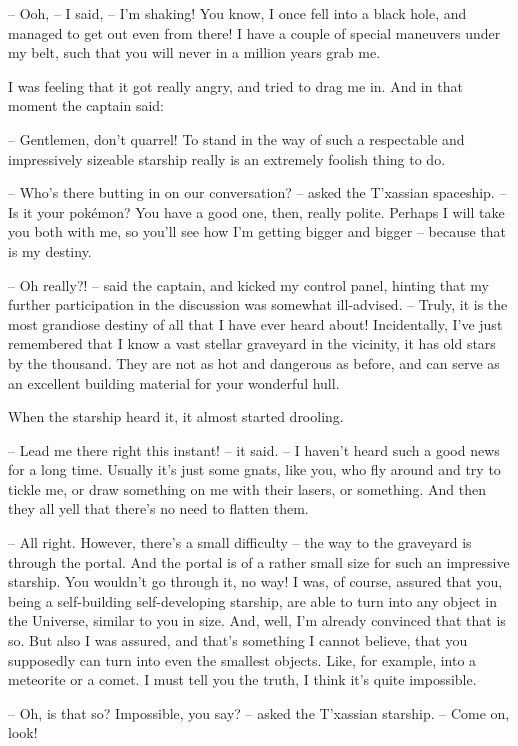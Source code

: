 \documentclass[ebook,oneside,final,openright]{memoir}
\begin{document}
– Ooh, – I said, – I’m shaking! You know, I once fell into a black hole, and managed to get out even from there! I have a couple of special maneuvers under my belt, such that you will never in a million years grab me.\par
\par
I was feeling that it got really angry, and tried to drag me in. And in that moment the captain said:\par
– Gentlemen, don’t quarrel! To stand in the way of such a respectable and impressively sizeable starship really is an extremely foolish thing to do.\par
– Who’s there butting in on our conversation? – asked the T’xassian spaceship. – Is it your pokémon? You have a good one, then, really polite. Perhaps I will take you both with me, so you’ll see how I’m getting bigger and bigger – because that is my destiny.\par
– Oh really?! – said the captain, and kicked my control panel, hinting that my further participation in the discussion was somewhat ill-advised. – Truly, it is the most grandiose destiny of all that I have ever heard about! Incidentally, I’ve just remembered that I know a vast stellar graveyard in the vicinity, it has old stars by the thousand. They are not as hot and dangerous as before, and can serve as an excellent building material for your wonderful hull.\par
When the starship heard it, it almost started drooling.\par
– Lead me there right this instant! – it said. – I haven’t heard such a good news for a long time. Usually it’s just some gnats, like you, who fly around and try to tickle me, or draw something on me with their lasers, or something. And then they all yell that there’s no need to flatten them.\par
– All right. However, there’s a small difficulty – the way to the graveyard is through the portal. And the portal is of a rather small size for such an impressive starship. You wouldn’t go through it, no way! I was, of course, assured that you, being a self-building self-developing starship, are able to turn into any object in the Universe, similar to you in size. And, well, I’m already convinced that that is so. But also I was assured, and that’s something I cannot believe, that you supposedly can turn into even the smallest objects. Like, for example, into a meteorite or a comet. I must tell you the truth, I think it’s quite impossible.\par
– Oh, is that so? Impossible, you say? – asked the T’xassian starship. – Come on, look!\par
\end{document}
